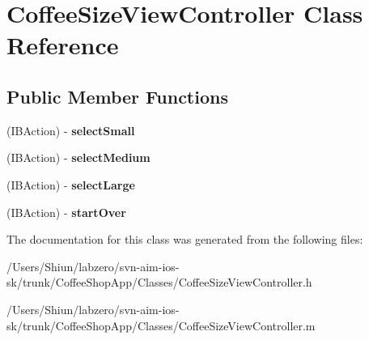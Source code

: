 \hypertarget{interface_coffee_size_view_controller}{
\section{CoffeeSizeViewController Class Reference}
\label{interface_coffee_size_view_controller}
}
\subsection*{Public Member Functions}
\begin{DoxyCompactItemize}
\item 
\hypertarget{interface_coffee_size_view_controller_a5ca16f0a7b1c85c101cd82d54f9bcc3e}{
(IBAction) -\/ {\bfseries selectSmall}}
\label{interface_coffee_size_view_controller_a5ca16f0a7b1c85c101cd82d54f9bcc3e}

\item 
\hypertarget{interface_coffee_size_view_controller_a32135b30864edd105093169b7a5ad8b6}{
(IBAction) -\/ {\bfseries selectMedium}}
\label{interface_coffee_size_view_controller_a32135b30864edd105093169b7a5ad8b6}

\item 
\hypertarget{interface_coffee_size_view_controller_a73c81dc1fa560f8cd106648cd79941e7}{
(IBAction) -\/ {\bfseries selectLarge}}
\label{interface_coffee_size_view_controller_a73c81dc1fa560f8cd106648cd79941e7}

\item 
\hypertarget{interface_coffee_size_view_controller_add6029ad422820c8f8e65c1bb41eba94}{
(IBAction) -\/ {\bfseries startOver}}
\label{interface_coffee_size_view_controller_add6029ad422820c8f8e65c1bb41eba94}

\end{DoxyCompactItemize}


The documentation for this class was generated from the following files:\begin{DoxyCompactItemize}
\item 
/Users/Shiun/labzero/svn-\/aim-\/ios-\/sk/trunk/CoffeeShopApp/Classes/CoffeeSizeViewController.h\item 
/Users/Shiun/labzero/svn-\/aim-\/ios-\/sk/trunk/CoffeeShopApp/Classes/CoffeeSizeViewController.m\end{DoxyCompactItemize}
